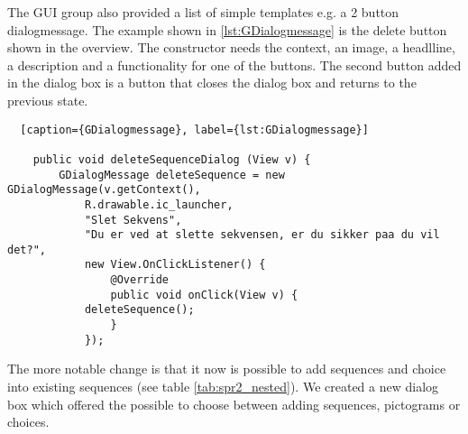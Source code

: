 The GUI group also provided a list of simple templates e.g. a 2 button dialogmessage. The example shown in \ref{lst:GDialogmessage} is the delete button shown in the overview. The constructor needs the context, an image, a headlline, a description and a functionality for one of the buttons. The second button added in the dialog box is a button that closes the dialog box and returns to the previous state.

\begin{lstlisting}  [caption={GDialogmessage}, label={lst:GDialogmessage}]

    public void deleteSequenceDialog (View v) {
        GDialogMessage deleteSequence = new GDialogMessage(v.getContext(),
            R.drawable.ic_launcher,
            "Slet Sekvens",
            "Du er ved at slette sekvensen, er du sikker paa du vil det?",
            new View.OnClickListener() {
                @Override
                public void onClick(View v) {
			deleteSequence();
                }
            });

\end{lstlisting}

The more notable change is that it now is possible to add sequences and choice into existing sequences (see table \ref{tab:spr2_nested}). We created a new dialog box which offered the possible to choose between adding sequences, pictograms or choices. 